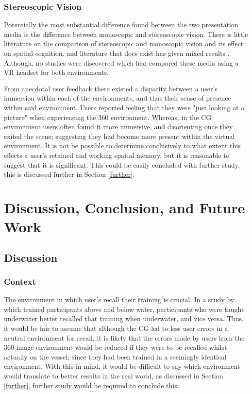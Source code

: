 \documentclass[ %
                    author={Elis Jones},
                supervisor={Dr. Kirsten Cater},
                    degree={BSc},
                     title={The Effect of Presentation Medium on Spatial Cognition},
                  subtitle={in the Virtual Environment},
                      year={2018} ]{dissertation}
\begin{document}
\subsection{Stereoscopic Vision}\label{stereo}
Potentially the most substantial difference found between the two presentation media is the difference between monoscopic and stereoscopic vision. There is little literature on the comparison of stereoscopic and monoscopic vision and its effect on spatial cognition, and literature that does exist has given mixed results \citep{price}. Although, no studies were discovered which had compared these media using a VR headset for both environments. 

From anecdotal user feedback there existed a disparity between a user's immersion within each of the environments, and thus their sense of presence within said environment. Users reported feeling that they were "just looking at a picture" when experiencing the 360 environment. Whereas, in the CG environment users often found it more immersive, and disorienting once they exited the scene; suggesting they had become more present within the virtual environment. It is not be possible to determine conclusively to what extent this effects a user's retained and working spatial memory, but it is reasonable to suggest that it is significant. This could be easily concluded with further study, this is discussed further in Section \ref{further}. 


\chapter{Discussion, Conclusion, and Future Work}


\section{Discussion}\label{discussion}

\subsection{Context}\label{context}
The environment in which user's recall their training is crucial. In a study by \cite{Godden1975} which trained participants above and below water, participants who were taught underwater better recalled that training when underwater, and vice versa. Thus, it would be fair to assume that although the CG led to less user errors in a neutral environment for recall, it is likely that the errors made by users from the 360-image environment would be reduced if they were to be recalled whilst actually on the vessel; since they had been trained in a seemingly identical environment. With this in mind, it would be difficult to say which environment would translate to better results in the real world, as discussed in Section \ref{further}, further study would be required to conclude this. 
\end{document}
